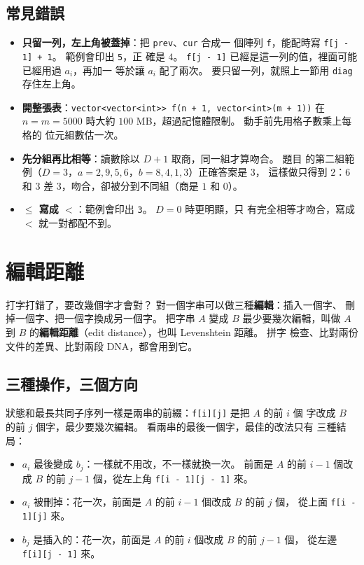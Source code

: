 \subsection{常見錯誤}

\begin{itemize}
\item \textbf{只留一列，左上角被蓋掉}：把 \texttt{prev}、\texttt{cur} 合成一
個陣列 \texttt{f}，能配時寫 \texttt{f[j - 1] + 1}。 範例會印出 \texttt{5}，正
確是 $4$。 \texttt{f[j - 1]} 已經是這一列的值，裡面可能已經用過 $a_i$，再加一
等於讓 $a_i$ 配了兩次。 要只留一列，就照上一節用 \texttt{diag} 存住左上角。
\item \textbf{開整張表}：\texttt{vector<vector<int>> f(n + 1, vector<int>(m + 1))}
在 $n = m = 5000$ 時大約 $100$ MB，超過記憶體限制。 動手前先用格子數乘上每格的
位元組數估一次。
\item \textbf{先分組再比相等}：讀數除以 $D + 1$ 取商，同一組才算吻合。 題目
的第二組範例（$D = 3$，$a = 2, 9, 5, 6$，$b = 8, 4, 1, 3$）正確答案是 $3$，
這樣做只得到 $2$：$6$ 和 $3$ 差 $3$，吻合，卻被分到不同組（商是 $1$ 和
$0$）。
\item \textbf{$\le$ 寫成 $<$}：範例會印出 \texttt{3}。 $D = 0$ 時更明顯，只
有完全相等才吻合，寫成 $<$ 就一對都配不到。
\end{itemize}

\section{編輯距離}
\label{sec:ss-edit}

打字打錯了，要改幾個字才會對？ 對一個字串可以做三種\textbf{編輯}：插入一個字、
刪掉一個字、把一個字換成另一個字。 把字串 $A$ 變成 $B$ 最少要幾次編輯，叫做
$A$ 到 $B$ 的\textbf{編輯距離}（edit distance），也叫 Levenshtein 距離。 拼字
檢查、比對兩份文件的差異、比對兩段 DNA，都會用到它。

\subsection{三種操作，三個方向}
\label{sec:ss-edit-table}

狀態和最長共同子序列一樣是兩串的前綴：\texttt{f[i][j]} 是把 $A$ 的前 $i$ 個
字改成 $B$ 的前 $j$ 個字，最少要幾次編輯。 看兩串的最後一個字，最佳的改法只有
三種結局：

\begin{itemize}
\item $a_i$ 最後變成 $b_j$：一樣就不用改，不一樣就換一次。 前面是 $A$ 的前
$i - 1$ 個改成 $B$ 的前 $j - 1$ 個，從左上角 \texttt{f[i - 1][j - 1]} 來。
\item $a_i$ 被刪掉：花一次，前面是 $A$ 的前 $i - 1$ 個改成 $B$ 的前 $j$ 個，
從上面 \texttt{f[i - 1][j]} 來。
\item $b_j$ 是插入的：花一次，前面是 $A$ 的前 $i$ 個改成 $B$ 的前 $j - 1$ 個，
從左邊 \texttt{f[i][j - 1]} 來。
\end{itemize}

